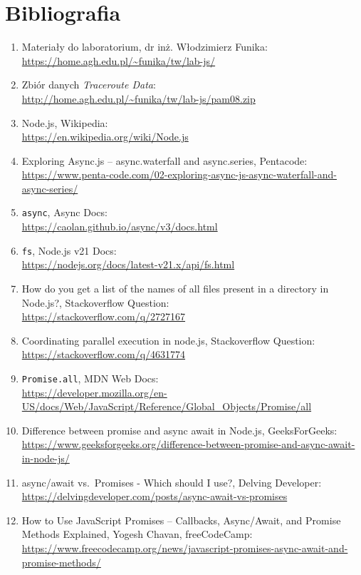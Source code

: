 \documentclass[11pt]{article}
\begin{document}
    \hypertarget{bibliografia}{%
\section{Bibliografia}\label{bibliografia}}

\begin{enumerate}
\def\labelenumi{\arabic{enumi}.}
\item
  Materiały do laboratorium, dr inż. Włodzimierz Funika:\\
  \url{https://home.agh.edu.pl/~funika/tw/lab-js/}
\item
  Zbiór danych \emph{Traceroute Data}:\\
  \url{http://home.agh.edu.pl/~funika/tw/lab-js/pam08.zip}
\item
  Node.js, Wikipedia:\\
  \url{https://en.wikipedia.org/wiki/Node.js}
\item
  Exploring Async.js -- async.waterfall and async.series, Pentacode:\\
  \url{https://www.penta-code.com/02-exploring-async-js-async-waterfall-and-async-series/}
\item
  \texttt{async}, Async Docs:\\
  \url{https://caolan.github.io/async/v3/docs.html}
\item
  \texttt{fs}, Node.js v21 Docs:\\
  \url{https://nodejs.org/docs/latest-v21.x/api/fs.html}
\item
  How do you get a list of the names of all files present in a directory
  in Node.js?, Stackoverflow Question:\\
  \url{https://stackoverflow.com/q/2727167}
\item
  Coordinating parallel execution in node.js, Stackoverflow Question:\\
  \url{https://stackoverflow.com/q/4631774}
\item
  \texttt{Promise.all}, MDN Web Docs:\\
  \url{https://developer.mozilla.org/en-US/docs/Web/JavaScript/Reference/Global_Objects/Promise/all}
\item
  Difference between promise and async await in Node.js,
  GeeksForGeeks:\\
  \url{https://www.geeksforgeeks.org/difference-between-promise-and-async-await-in-node-js/}
\item
  async/await vs.~Promises - Which should I use?, Delving Developer:\\
  \url{https://delvingdeveloper.com/posts/async-await-vs-promises}
\item
  How to Use JavaScript Promises -- Callbacks, Async/Await, and Promise
  Methods Explained, Yogesh Chavan, freeCodeCamp:\\
  \url{https://www.freecodecamp.org/news/javascript-promises-async-await-and-promise-methods/}
\end{enumerate}


    
    
    
\end{document}
